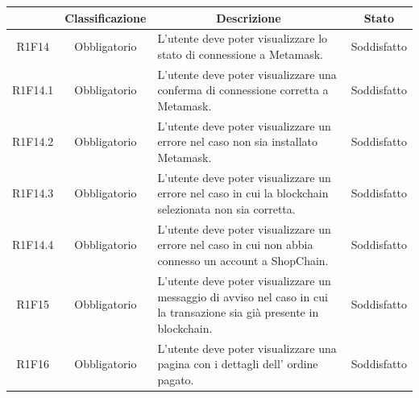\begin{table}[H]
    \centering
    \renewcommand{\arraystretch}{1.8}
    \begin{tabular}{c | c | p{6cm} | c}
        \rowcolor[HTML]{125E28}
        \multicolumn{1}{c}{\color[HTML]{FFFFFF} \textbf{Codice}}          &
        \multicolumn{1}{c}{\color[HTML]{FFFFFF} \textbf{Classificazione}} &
        \multicolumn{1}{c}{\color[HTML]{FFFFFF} \textbf{Descrizione}}     &
        \multicolumn{1}{c}{\color[HTML]{FFFFFF} \textbf{Stato}}                                                                                                                                                                   \\
        \hline
        R1F14                                                             & Obbligatorio & L'utente deve poter visualizzare lo stato di connessione a Metamask\glo{}.                                       &Soddisfatto                      \\
        R1F14.1                                                           & Obbligatorio & L'utente deve poter visualizzare una conferma di connessione corretta a Metamask\glo{}.                      & Soddisfatto                     \\
        R1F14.2                                                           & Obbligatorio & L'utente deve poter visualizzare un errore nel caso non sia installato Metamask\glo{}.                                             & Soddisfatto   \\
        R1F14.3                                                           & Obbligatorio & L'utente deve poter visualizzare un errore nel caso in cui la blockchain selezionata non sia corretta.                       & Soddisfatto   \\
        R1F14.4                                                           & Obbligatorio & L'utente deve poter visualizzare un errore nel caso in cui non abbia connesso un account a ShopChain.                        & Soddisfatto   \\
        R1F15                                                             & Obbligatorio & L'utente deve poter visualizzare un messaggio di avviso nel caso in cui la transazione sia già presente in blockchain\glo{}. & Soddisfatto \\
        R1F16                                                             &Obbligatorio  & L'utente deve poter visualizzare una pagina con i dettagli dell' ordine pagato.                                               & Soddisfatto\\

\end{tabular}
\end{table}
